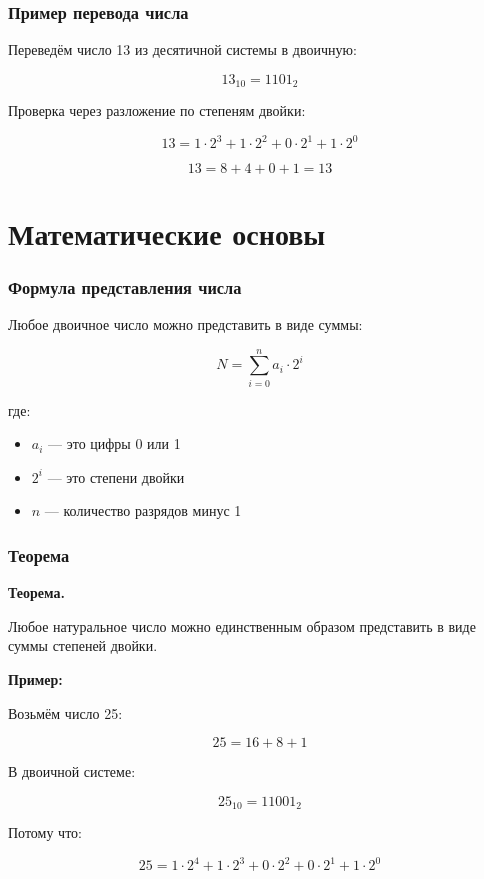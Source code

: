 \documentclass{beamer}
\begin{document}
	\begin{frame}
		\frametitle{Пример перевода числа}
		
		Переведём число 13 из десятичной системы в двоичную:
		
		\pause
		
		\[
		13_{10} = 1101_2
		\]
		
		\pause
		
		Проверка через разложение по степеням двойки:
		
		\[
		13 = 1 \cdot 2^3 + 1 \cdot 2^2 + 0 \cdot 2^1 + 1 \cdot 2^0
		\]
		
		\pause
		
		\[
		13 = 8 + 4 + 0 + 1 = 13
		\]
		
	\end{frame}
	
	\section{Математические основы}
	
	\begin{frame}
		\frametitle{Формула представления числа}
		
		Любое двоичное число можно представить в виде суммы:
		
		\begin{equation}
			N = \sum_{i=0}^{n} a_i \cdot 2^i
		\end{equation}
		
		\pause
		
		где:
		\begin{itemize}
			\item $a_i$ — это цифры 0 или 1
			\item $2^i$ — это степени двойки
			\item $n$ — количество разрядов минус 1
		\end{itemize}
		
	\end{frame}
	
	\begin{frame}
		\frametitle{Теорема}
		
		\textbf{Теорема.}
		
		Любое натуральное число можно единственным образом представить в виде суммы степеней двойки.
		
		\pause
		
		\textbf{Пример:}
		
		Возьмём число 25:
		
		\[
		25 = 16 + 8 + 1
		\]
		
		\pause
		
		В двоичной системе:
		
		\[
		25_{10} = 11001_2
		\]
		
		\pause
		
		Потому что:
		
		\begin{equation}
			25 = 1 \cdot 2^4 + 1 \cdot 2^3 + 0 \cdot 2^2 + 0 \cdot 2^1 + 1 \cdot 2^0
		\end{equation}
		
	\end{frame}
	
\end{document}
